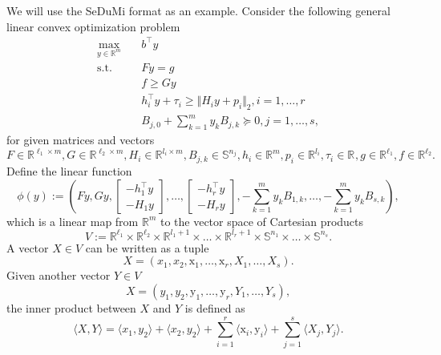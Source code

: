 \documentclass[
]{book}
\theoremstyle{definition}
\theoremstyle{definition}
\theoremstyle{definition}
\theoremstyle{definition}
\theoremstyle{remark}
\begin{document}
We will use the SeDuMi format as an example. Consider the following general linear convex optimization problem
\begin{equation}
\begin{split}
\max_{y \in \mathbb{R}^{m}} & \quad b^\top y \\
\mathrm{s.t.}& \quad Fy = g \\
& \quad f \geq Gy \\
& \quad h_i^\top y + \tau_i \geq \Vert H_i y + p_i \Vert_2, i=1,\dots,r \\
& \quad B_{j,0} + \sum_{k=1}^m y_k B_{j,k} \succeq 0, j=1,\dots,s,
\end{split}
\label{eq:general-convex-sedumi}
\end{equation}
for given matrices and vectors
\[
F \in \mathbb{R}^{\ell_1 \times m},G \in \mathbb{R}^{\ell_2 \times m},H_i \in \mathbb{R}^{l_i \times m}, B_{j,k} \in \mathbb{S}^{n_j}, h_i \in \mathbb{R}^{m}, p_i \in \mathbb{R}^{l_i}, \tau_i \in \mathbb{R}^{}, g \in \mathbb{R}^{\ell_1},f \in \mathbb{R}^{\ell_2}.
\]
Define the linear function
\[
\phi(y):= \left(Fy, Gy, \begin{bmatrix} - h_1^\top y \\ - H_1 y \end{bmatrix}, \dots, \begin{bmatrix} - h_r^\top y \\ - H_r y \end{bmatrix}, - \sum_{k=1}^m y_k B_{1,k}, \dots,- \sum_{k=1}^m y_k B_{s,k} \right),
\]
which is a linear map from \(\mathbb{R}^{m}\) to the vector space of Cartesian products
\[
V:= \mathbb{R}^{\ell_1} \times \mathbb{R}^{\ell_2} \times \mathbb{R}^{l_1+1} \times \dots \times \mathbb{R}^{l_r + 1} \times \mathbb{S}^{n_1}\times \dots \times \mathbb{S}^{n_s}.
\]
A vector \(X \in V\) can be written as a tuple
\[
X = (x_1,x_2,\mathrm{x}_1,\dots,\mathrm{x}_r,X_1,\dots,X_s).
\]
Given another vector \(Y \in V\)
\[
X = (y_1,y_2,\mathrm{y}_1,\dots,\mathrm{y}_r,Y_1,\dots,Y_s),
\]
the inner product between \(X\) and \(Y\) is defined as
\[
\langle X, Y \rangle = \langle x_1, y_2 \rangle + \langle x_2, y_2 \rangle + \sum_{i=1}^r \langle \mathrm{x}_i, \mathrm{y}_i \rangle + \sum_{j=1}^s \langle X_j, Y_j \rangle.
\]
\end{document}

